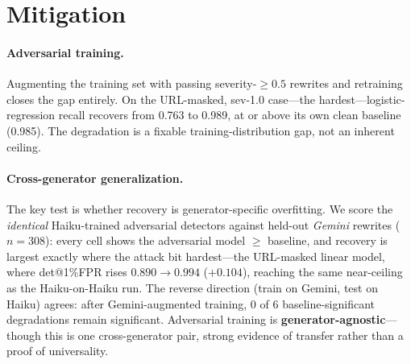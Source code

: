 \documentclass[11pt]{article}
\begin{document}
\section{Mitigation}\label{sec:mitigation}
\paragraph{Adversarial training.} Augmenting the training set with passing
severity-$\geq0.5$ rewrites and retraining closes the gap entirely. On the
URL-masked, sev-1.0 case---the hardest---logistic-regression recall recovers from
0.763 to 0.989, at or above its own clean baseline (0.985). The degradation is a
fixable training-distribution gap, not an inherent ceiling.

\paragraph{Cross-generator generalization.} The key test is whether recovery is
generator-specific overfitting. We score the \emph{identical} Haiku-trained
adversarial detectors against held-out \emph{Gemini} rewrites ($n=308$): every cell
shows the adversarial model $\geq$ baseline, and recovery is largest exactly where
the attack bit hardest---the URL-masked linear model, where det@1\%FPR rises
$0.890\!\to\!0.994$ (\textbf{$+0.104$}), reaching the same near-ceiling as the
Haiku-on-Haiku run. The reverse direction (train on Gemini, test on Haiku) agrees:
after Gemini-augmented training, 0 of 6 baseline-significant degradations remain
significant. Adversarial training is \textbf{generator-agnostic}---though this is
one cross-generator pair, strong evidence of transfer rather than a proof of
universality.
\end{document}
